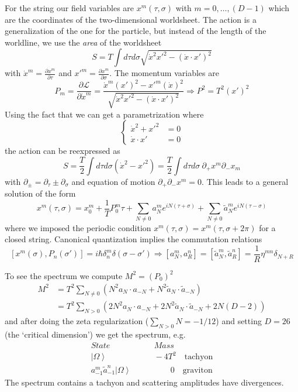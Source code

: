 \documentclass[a4paper,12pt]{article}
\numberwithin{equation}{section}
\numberwithin{exe}{section}
\newcommand{\lag}{{\mathcal L}}
\newcommand{\p}{{\partial}}
\newcommand{\vac}{{\left|\Omega\right>}}
\newcommand{\at}{{\tilde a}}
\newcommand{\xd}{{\dot x}}
\renewcommand{\d}{{\delta}}
\newcommand{\s}{{\sigma}}
\begin{document}
For the string our field variables are $x^m(\tau, \s)$ with $m=0,\ldots, (D-1)$ which are the coordinates of the two-dimensional worldsheet. The action is a generalization of the one for the particle, but instead of the length of the worldline, we use the {\it area} of the worldsheet
	\begin{equation}
	S = T \int d\tau d\s \sqrt{\xd^2 x'^2 - (\xd\cdot x')^2}
	\end{equation}
with $\xd^m = \frac{\p x^m}{\p\tau}$ and $x'^m = \frac{\p x^m}{\p\s}$. The momentum variables are
	\begin{equation}
	P_m = \frac{\p \lag}{\p\xd^m} = \frac{\xd^m (x')^2 - x'^m (\xd)^2}{\sqrt{\xd^2 x'^2 - (\xd\cdot x')^2}} \Rightarrow P^2 = T^2 (x')^2
	\end{equation}
Using the fact that we can get a parametrization where
	\begin{equation}
	\left\{
		\begin{aligned}
		\xd^2 + x'^2 & = 0 \\
		\xd\cdot x' & = 0
		\end{aligned}
	\right.
	\end{equation}
the action can be reexpressed as
	\begin{equation}
	S = \frac{T}{2} \int d\tau d\s (\xd^2 - x'^2) = \frac{T}{2} \int d\tau d\s\ \p_+ x^m \p_- x_m
	\end{equation}
with $\p_{\pm} = \p_\tau \pm \p_\s$ and equation of motion $\p_+\p_- x^m = 0$. This leads to a general solution of the form
	\begin{equation}
	x^m(\tau,\s) = x^m_0 + \frac{1}{T} P^m_0 \tau + \sum_{N\neq 0} a^m_N e^{iN(\tau+\s)} + \sum_{N\neq 0}\at_N^m e^{iN(\tau-\s)}
	\end{equation}
where we imposed the periodic condition $x^m(\tau,\s) = x^m(\tau,\s+2\pi)$ for a closed string. Canonical quantization implies the commutation relations
	\begin{equation}\label{ccr}
	[x^m(\s), P_n(\s')] = i\hbar \d^m_n \d(\s-\s')\Rightarrow  [a^m_N, a^n_R] = [\at^m_N, \at^n_R] = \frac{1}{R} \eta^{mn} \d_{N+R}
	\end{equation}

To see the spectrum we compute $M^2 = (P_0)^2$
	\begin{align}
	M^2 & = T^2 \sum_{N\neq 0} (N^2 a_N \cdot a_{-N} + N^2 \at_N \cdot \at_{-N}) \nonumber \\
	& = T^2 \sum_{N> 0} (2N^2 a_N\cdot a_{-N} + 2N^2 \at_N\cdot \at_{-N} + 2N(D-2))
	\end{align}
and after doing the zeta regularization ($\sum_{N>0} N = -1/12$) and setting $D=26$ (the `critical dimension') we get the spectrum, e.g.
	\begin{equation}
		\begin{aligned}
		State \quad & \quad Mass \\
		\vac \quad & \quad -4T^2\quad\text{tachyon} \\
		a^m_{-1} \at^n_{-1} \vac \quad & \qquad\quad 0\quad\text{graviton}
		\end{aligned}
	\end{equation}
The spectrum contains a tachyon and scattering amplitudes have divergences.
\end{document}
